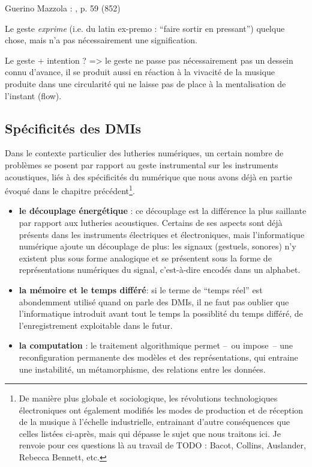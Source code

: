 Guerino Mazzola :  \cite{mazzola_topos_2018}, p. 59 (852)

Le geste \textit{exprime} (i.e. du latin ex-premo : ``faire sortir en pressant'') quelque chose, mais n'a pas nécessairement une signification.


Le geste + intention ? => le geste ne passe pas nécessairement pas un dessein connu d'avance, il se produit aussi en réaction à la vivacité de la musique produite dans une circularité qui ne laisse pas de place à la mentalisation de l'instant (flow).

\subsection{Spécificités des DMIs}

\noindent Dans le contexte particulier des lutheries numériques, un certain nombre de problèmes se posent par rapport au geste instrumental sur les instruments acoustiques, liés à des spécificités du numérique que nous avons déjà en partie évoqué dans le chapitre précédent\footnote{De manière plus globale et sociologique, les révolutions technologiques électroniques ont également modifiés les modes de production et de réception de la musique à l'échelle industrielle, entrainant d'autre conséquences que celles listées ci-après, mais qui dépasse le sujet que nous traitons ici. Je renvoie pour ces questions là au travail de TODO : Bacot, Collins, Auslander, Rebecca Bennett, etc.}.

\vspace{-1em}
\begin{itemize}[noitemsep]
\item \textbf{le découplage énergétique} : ce découplage est la différence la plus saillante par rapport aux lutheries acoustiques. Certains de ses aspects sont déjà présents dans les instruments électriques et électroniques, mais l'informatique numérique ajoute un découplage de plus: les signaux (gestuels, sonores) n'y existent plus sous forme analogique et se présentent sous la forme de représentations numériques du signal, c'est-à-dire encodés dans un alphabet.
\item \textbf{la mémoire et le temps différé}: si le terme de ``temps réel'' est abondemment utilisé quand on parle des \glspl{DMI}, il ne faut pas oublier que l'informatique introduit avant tout le temps la possiblité du temps différé, de l'enregistrement exploitable dans le futur.
\item \textbf{la computation} : le traitement algorithmique permet --~ou impose~-- une reconfiguration permanente des modèles et des représentations, qui entraine une instabilité, un métamorphisme, des relations entre les données.
\end{itemize}




